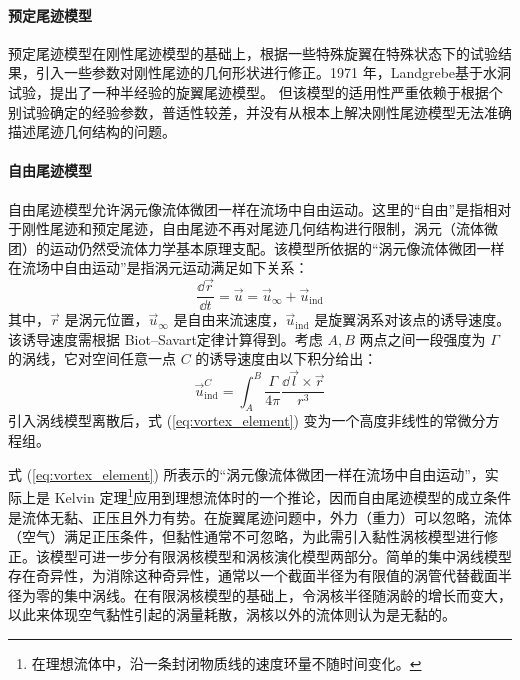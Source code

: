 \paragraph{预定尾迹模型}

预定尾迹模型在刚性尾迹模型的基础上，根据一些特殊旋翼在特殊状态下的试验结果，引入一些参数对刚性尾迹的几何形状进行修正。1971 年，Landgrebe基于水洞试验，提出了一种半经验的旋翼尾迹模型。
但该模型的适用性严重依赖于根据个别试验确定的经验参数，普适性较差，并没有从根本上解决刚性尾迹模型无法准确描述尾迹几何结构的问题。

\paragraph{自由尾迹模型}

自由尾迹模型允许涡元像流体微团一样在流场中自由运动。这里的“自由”是指相对于刚性尾迹和预定尾迹，自由尾迹不再对尾迹几何结构进行限制，涡元（流体微团）的运动仍然受流体力学基本原理支配。该模型所依据的“涡元像流体微团一样在流场中自由运动”是指涡元运动满足如下关系：
\begin{equation}
\frac{\dd\vec{r}}{\dd t}=\vec{u}=\vec{u}_{\infty}+\vec{u}_{\mathrm{ind}}\label{eq:vortex_element}
\end{equation}
其中，$\vec{r}$ 是涡元位置，$\vec{u}_{\infty}$ 是自由来流速度，$\vec{u}_{\mathrm{ind}}$
是旋翼涡系对该点的诱导速度。该诱导速度需根据 Biot–Savart定律计算得到。考虑
$A,B$ 两点之间一段强度为 $\Gamma$ 的涡线，它对空间任意一点 $C$ 的诱导速度由以下积分给出：
\begin{equation}
\vec{u}_{\mathrm{ind}}^{C}=\int_{A}^{B}\frac{\Gamma}{4\pi}\frac{\dd\vec{l}\times\vec{r}}{r^{3}}
\end{equation}
引入涡线模型离散后，式 (\ref{eq:vortex_element}) 变为一个高度非线性的常微分方程组。

式 (\ref{eq:vortex_element}) 所表示的“涡元像流体微团一样在流场中自由运动”，实际上是 Kelvin 定理\footnote{在理想流体中，沿一条封闭物质线的速度环量不随时间变化。}应用到理想流体时的一个推论，因而自由尾迹模型的成立条件是流体无黏、正压且外力有势。在旋翼尾迹问题中，外力（重力）可以忽略，流体（空气）满足正压条件，但黏性通常不可忽略，为此需引入黏性涡核模型进行修正。该模型可进一步分有限涡核模型和涡核演化模型两部分。简单的集中涡线模型存在奇异性，为消除这种奇异性，通常以一个截面半径为有限值的涡管代替截面半径为零的集中涡线。在有限涡核模型的基础上，令涡核半径随涡龄的增长而变大，以此来体现空气黏性引起的涡量耗散，涡核以外的流体则认为是无黏的。

